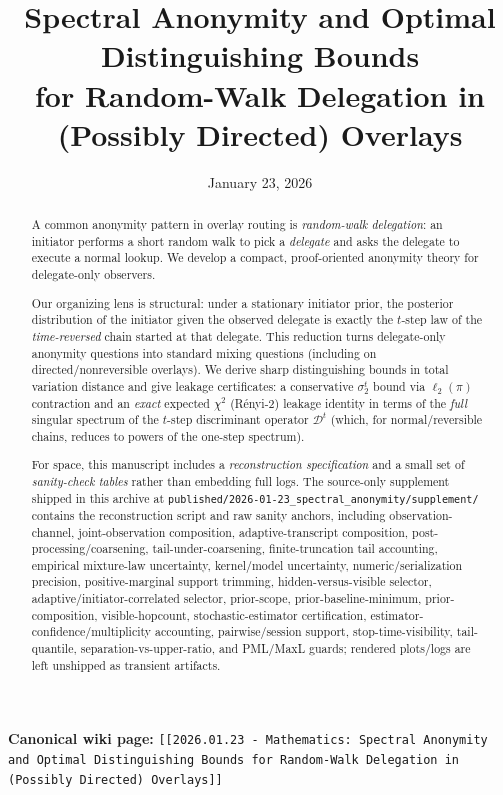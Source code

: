 \documentclass[11pt]{article}
\title{Spectral Anonymity and Optimal Distinguishing Bounds\\for Random-Walk Delegation in (Possibly Directed) Overlays}
\author{}
\date{January 23, 2026}
\newcommand{\cD}{\mathcal{D}}
\begin{document}
\maketitle

\noindent\textbf{Canonical wiki page:} \texttt{[[2026.01.23 - Mathematics: Spectral Anonymity and Optimal Distinguishing Bounds for Random-Walk Delegation in (Possibly Directed) Overlays]]}\\


\begin{abstract}
A common anonymity pattern in overlay routing is \emph{random-walk delegation}:
an initiator performs a short random walk to pick a \emph{delegate} and asks the
delegate to execute a normal lookup. We develop a compact, proof-oriented
anonymity theory for delegate-only observers.

Our organizing lens is structural: under a stationary initiator prior, the
posterior distribution of the initiator given the observed delegate is exactly
the $t$-step law of the \emph{time-reversed} chain started at that delegate.
This reduction turns delegate-only anonymity questions into standard mixing
questions (including on directed/nonreversible overlays). We derive sharp
distinguishing bounds in total variation distance and give leakage certificates:
a conservative $\sigma_2^t$ bound via $\ell_2(\pi)$ contraction and an \emph{exact}
expected $\chi^2$ (R\'enyi-2) leakage identity in terms of the \emph{full}
singular spectrum of the $t$-step discriminant operator $\cD^t$ (which, for
normal/reversible chains, reduces to powers of the one-step spectrum).

For space, this manuscript includes a \emph{reconstruction specification} and a
small set of \emph{sanity-check tables} rather than embedding full logs.
The source-only supplement shipped in this archive at
\texttt{published/2026-01-23\_spectral\_anonymity/supplement/}
contains the reconstruction script and raw sanity anchors, including observation-channel, joint-observation composition, adaptive-transcript composition, post-processing/coarsening, tail-under-coarsening, finite-truncation tail accounting, empirical mixture-law uncertainty, kernel/model uncertainty, numeric/serialization precision, positive-marginal support trimming, hidden-versus-visible selector, adaptive/initiator-correlated selector, prior-scope,
prior-baseline-minimum, prior-composition, visible-hopcount, stochastic-estimator certification, estimator-confidence/multiplicity accounting, pairwise/session support, stop-time-visibility, tail-quantile, separation-vs-upper-ratio, and PML/MaxL guards; rendered plots/logs are left
unshipped as transient artifacts.
\end{abstract}
\end{document}
